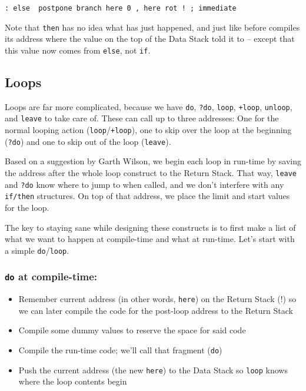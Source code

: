 \begin{lstlisting}[frame=lines]
        : else  postpone branch here 0 , here rot ! ; immediate
\end{lstlisting}

\noindent Note that \texttt{then} has no idea what has just happened, and just like before
compiles its address where the value on the top of the Data Stack told it to --
except that this value now comes from \texttt{else}, not \texttt{if}. 


\subsection{Loops} 

Loops are far more complicated, because we have \texttt{do}, \texttt{?do},
\texttt{loop}, \texttt{+loop}, \texttt{unloop}, and \texttt{leave} to take care
of. These can call up to three addresses: One for the normal looping action
(\texttt{loop}/\texttt{+loop}), one to skip over the loop at the beginning
(\texttt{?do}) and one to skip out of the loop (\texttt{leave}). 

Based on a suggestion by Garth Wilson, we begin each loop in run-time by saving
the address after the whole loop construct to the Return Stack. That way,
\texttt{leave} and \texttt{?do} know where to jump to when called, and we don't
interfere with any \texttt{if/then} structures. On top of that address, we place
the limit and start values for the loop. 

The key to staying sane while designing these constructs is to first make
a list of what we want to happen at compile-time and what at run-time. Let's
start with a simple \texttt{do}/\texttt{loop}.

\subsubsection{\texttt{do} at compile-time:}

\begin{itemize}

        \item Remember current address (in other words, \texttt{here}) on the
                Return Stack (!) so we can later compile the code for the
                post-loop address to the Return Stack

        \item Compile some dummy values to reserve the space for said code

        \item Compile the run-time code; we'll call that fragment (\texttt{do})

        \item Push the current address (the new \texttt{here}) to the Data Stack
                so \texttt{loop} knows where the loop contents begin

\end{itemize}

